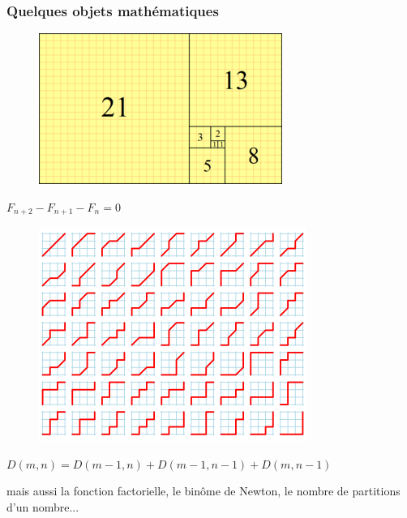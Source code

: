 \documentclass{beamer}
\begin{document}
\begin{frame}
\frametitle{Quelques objets mathématiques}
\begin{minipage}{0.45\textwidth} \begin{center}
    \begin{figure}\begin{center}
        \includegraphics[scale=0.5]{fibo}
    \end{center} \end{figure}
    $F_{n+2} - F_{n+1} - F_n = 0$
\end{center} \end{minipage}
\hspace{2ex}
\begin{minipage}{0.45\textwidth} \begin{center}
    \begin{figure}\begin{center}
        \includegraphics[scale=0.5]{delannoy}
    \end{center} \end{figure}
    $D(m,n) = D(m-1,n) + D(m-1,n-1) + D(m,n-1)$
\end{center} \end{minipage}
\vspace{1cm} \pause
\begin{center}
{\large mais aussi la fonction factorielle, le binôme de Newton, le nombre de partitions d'un
    nombre...}
\end{center}
\end{frame}
\end{document}
